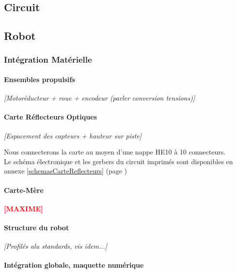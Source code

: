  \subsection{Circuit}


\subsection{Robot}

	\subsubsection{Intégration Matérielle}

		\paragraph{Ensembles propulsifs}

			\textit{[Motoréducteur + roue + encodeur (parler conversion tensions)]}

		\paragraph{Carte Réflecteurs Optiques}\label{integrationReflecteurs}



			\textit{[Espacement des capteurs + hauteur sur piste]}




			Nous connecterons la carte au moyen d'une nappe HE10 à 10 connecteurs.\\

			Le schéma électronique et les gerbers du circuit imprimés sont disponibles en annexe \ref{schemasCarteReflecteurs} (page \pageref{schemasCarteReflecteurs})

		\paragraph{Carte-Mère}\label{carteMere}

			\textbf{\huge{\textcolor{red}{[MAXIME]}}}


		\paragraph{Structure du robot}


			\textit{[Profilés alu standards, vis idem...]}


		\paragraph{Intégration globale, maquette numérique}

